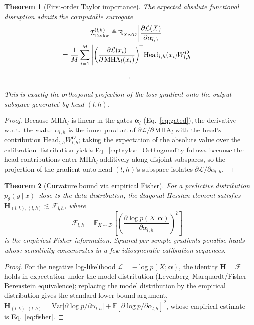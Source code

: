 \documentclass[11pt]{article}
\newtheorem{theorem}{Theorem}
\begin{document}
\begin{theorem}[First-order Taylor importance]
\label{thm:taylor}
The expected absolute functional disruption admits the computable surrogate
\begin{multline}\mathcal{I}^{(l,h)}_{\mathrm{Taylor}}
\triangleq\mathbb{E}_{X\sim\mathcal{D}}\left|\frac{\partial\mathcal{L}(X)}{\partial\alpha_{l,h}}\right|
\\=\frac{1}{M}\sum_{i=1}^{M}\left|\left(\frac{\partial\mathcal{L}(x_i)}{\partial\,\mathrm{MHA}_l(x_i)}\right)^{\!\top}\!\mathrm{Head}_{l,h}(x_i)W^{O}_{l,h}\right.\\\left.\vphantom{\frac{\partial\mathcal{L}}{\partial\alpha_{l,h}}}\right|.\label{eq:taylor}\end{multline}
This is exactly the orthogonal projection of the loss gradient onto the output
subspace generated by head $(l,h)$.
\end{theorem}
\begin{proof}
Because $\mathrm{MHA}_l$ is linear in the gates $\boldsymbol{\alpha}_l$
(Eq.~\ref{eq:gated}), the derivative w.r.t.\ the scalar $\alpha_{l,h}$ is the
inner product of $\partial\mathcal{L}/\partial\,\mathrm{MHA}_l$ with the head's
contribution $\mathrm{Head}_{l,h}W^{O}_{l,h}$; taking the expectation of the
absolute value over the calibration distribution yields Eq.~\ref{eq:taylor}.
Orthogonality follows because the head contributions enter
$\mathrm{MHA}_l$ additively along disjoint subspaces, so the projection of the
gradient onto head $(l,h)$'s subspace isolates $\partial\mathcal{L}/\partial\alpha_{l,h}$.
\end{proof}

\begin{theorem}[Curvature bound via empirical Fisher]
\label{thm:fisher}
For a predictive distribution $p_\theta(y\mid x)$ close to the data
distribution, the diagonal Hessian element satisfies
$\mathbf{H}_{(l,h),(l,h)}\lesssim\mathcal{F}_{l,h}$, where
\begin{equation}
\mathcal{F}_{l,h}=\mathbb{E}_{X\sim\mathcal{D}}\left[\left(\frac{\partial\log p(X;\boldsymbol{\alpha})}{\partial\alpha_{l,h}}\right)^{2}\right]
\label{eq:fisher}
\end{equation}
is the empirical Fisher information. Squared per-sample gradients penalise heads
whose sensitivity concentrates in a few idiosyncratic calibration sequences.
\end{theorem}
\begin{proof}
For the negative log-likelihood $\mathcal{L}=-\log p(X;\boldsymbol{\alpha})$, the
identity $\mathbf{H}=\mathcal{F}$ holds in expectation under the model
distribution (Levenberg--Marquardt/Fisher--Berenstein equivalence); replacing the
model distribution by the empirical distribution gives the standard lower-bound
argument, $\mathbf{H}_{(l,h),(l,h)}=\mathrm{Var}\big[\partial\log p/\partial\alpha_{l,h}\big]+\mathbb{E}[\partial\log p/\partial\alpha_{l,h}]^{2}$,
whose empirical estimate is Eq.~\ref{eq:fisher}.
\end{proof}
\end{document}
